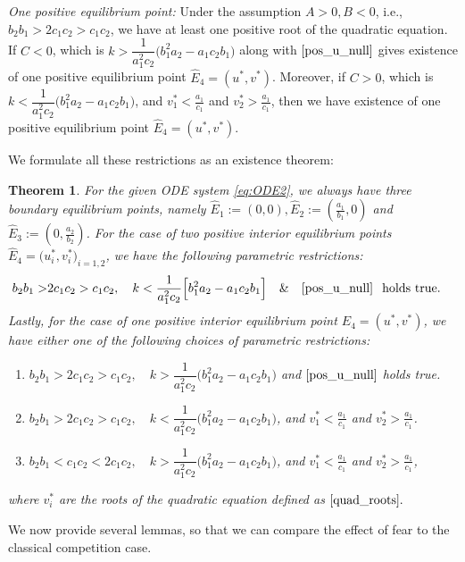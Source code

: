 \documentclass[10pt]{amsart}
\newtheorem{theorem}{Theorem}[section]
\theoremstyle{definition}
\begin{document}
	\textit{One positive equilibrium point:} Under the assumption $A>0,B<0$, i.e., $b_2b_1>2c_1c_2>c_1c_2$, we have at least one positive root of the quadratic equation. If $C<0$, which is $k>\dfrac{1}{a_1^2c_2} \Big( b_1^2a_2-a_1c_2b_1\Big)$ along with $\eqref{pos_u_null}$ gives existence of one positive equilibrium point $\widehat{E}_4=(u^*,v^*)$. Moreover, if $C>0$, which is $k<\dfrac{1}{a_1^2c_2} \Big( b_1^2a_2-a_1c_2b_1\Big)$, and $v_1^*<\frac{a_1}{c_1}$ and $v_2^*>\frac{a_1}{c_1}$, then we have existence of one positive equilibrium point $\widehat{E}_4=(u^*,v^*)$.
	
	We formulate all these restrictions as an existence theorem:

\begin{theorem}\label{thm:exist}
	For the given ODE system \eqref{eq:ODE2}, we always have three boundary equilibrium points, namely  $\widehat{E}_1:=(0,0),\widehat{E}_2:=(\frac{a_1}{b_1},0)$ and $\widehat{E}_3:=(0,\frac{a_2}{b_2})$. 
	For the case of two positive interior equilibrium points $\widehat{E}_4=\Big(u_i^*,v_i^*\Big)_{i=1,2}$, we have the following parametric restrictions:
	\begin{align*}
		b_2b_1>&2c_1c_2>c_1c_2, \quad k<\frac{1}{a_1^2c_2} \Big[ b_1^2a_2-a_1c_2b_1\Big] \quad
		\& \quad \eqref{pos_u_null} \hspace{0.1in} \text{holds true}.
	\end{align*}
	Lastly, for the case of one positive interior equilibrium point $\widehat{E}_4=(u^*,v^*)$, we have either one of the following choices of parametric restrictions:
	\begin{enumerate}
		\item $b_2b_1>2c_1c_2>c_1c_2, \quad k>\dfrac{1}{a_1^2c_2} \Big( b_1^2a_2-a_1c_2b_1\Big)$  and $\eqref{pos_u_null}$ holds true.
		\item $b_2b_1>2c_1c_2>c_1c_2, \quad k<\dfrac{1}{a_1^2c_2} \Big( b_1^2a_2-a_1c_2b_1\Big)$, and $v_1^*<\frac{a_1}{c_1}$ and $v_2^*>\frac{a_1}{c_1}$.
		\item $b_2b_1<c_1c_2<2c_1c_2,\quad k>\dfrac{1}{a_1^2c_2} \Big( b_1^2a_2-a_1c_2b_1\Big)$, and $v_1^*<\frac{a_1}{c_1}$ and $v_2^*>\frac{a_1}{c_1}$,
	\end{enumerate}
	where $v_i^*$ are the roots of the quadratic equation defined as $\eqref{quad_roots}.$
\end{theorem}


We now provide several lemmas, so that we can compare the effect of fear to the classical competition case.
\end{document}
